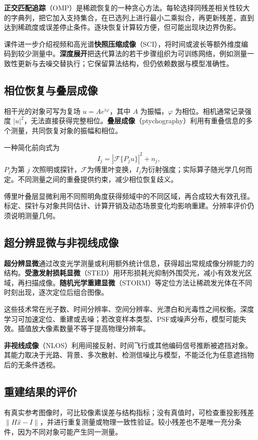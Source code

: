 \documentclass[UTF8,fontset=none,zihao=-4,a4paper]{ctexart}
\newcommand{\term}[1]{\textbf{#1}}
\begin{document}
\term{正交匹配追踪}（OMP）是稀疏恢复的一种贪心方法。每轮选择同残差相关性较大的字典列，把它加入支持集合，在已选列上进行最小二乘拟合，再更新残差，直到达到稀疏度或误差停止条件。逐块恢复计算较方便，但可能出现块边界伪影。

课件进一步介绍视频和高光谱\term{快照压缩成像}（SCI），将时间或波长等额外维度编码到较少测量中。\term{深度展开}把迭代算法的若干步骤组织为可训练网络，例如测量一致性更新与去噪交替执行；它保留算法结构，但仍依赖数据与模型准确性。

\subsection{相位恢复与叠层成像}
相干光的对象可写为复场 $u=Ae^{i\varphi}$，其中 $A$ 为振幅，$\varphi$ 为相位。相机通常记录强度 $|u|^2$，无法直接获得完整相位。\term{叠层成像}（ptychography）利用有重叠信息的多个测量，共同恢复对象的振幅和相位。

一种简化前向式为
\[
I_j=\left|\mathcal F\{P_j u\}\right|^2+n_j,
\]
$P_j$为第 $j$ 次照明或探针，$\mathcal F$为傅里叶变换，$I_j$为衍射强度；实际算子随光学几何而定。不同测量之间的重叠提供约束，减少相位恢复歧义。

傅里叶叠层显微利用不同照明角度获得频域中的不同区域，再合成较大有效孔径。标定、探针与对象共同估计、计算开销及动态场景变化均影响重建。分辨率评价仍须说明测量几何。

\subsection{超分辨显微与非视线成像}
\term{超分辨显微}通过改变光学测量或利用额外统计信息，获得超出常规成像分辨能力的结构。\term{受激发射损耗显微}（STED）用环形损耗光抑制外围荧光，减小有效发光区域，再扫描成像。\term{随机光学重建显微}（STORM）等定位方法让稀疏发光体在不同时刻出现，逐次定位后组合图像。

这些技术常在光子数、时间分辨率、空间分辨率、光漂白和光毒性之间权衡。深度学习可加速定位、重建或去噪；若改变样本类型、PSF或噪声分布，模型可能失效。插值放大像素数量不等于提高物理分辨率。

\term{非视线成像}（NLOS）利用间接反射、时间飞行或其他编码信号推断被遮挡对象。其能力取决于光路、背景、多次散射、检测信噪比与模型，不能泛化为任意遮挡物后的无条件透视。

\subsection{重建结果的评价}
有真实参考图像时，可比较像素误差与结构指标；没有真值时，可检查重投影残差 $\|H\hat x-I\|$，并进行重复测量或物理一致性验证。较小残差也不是唯一充分条件，因为不同对象可能产生同一测量。
\end{document}
